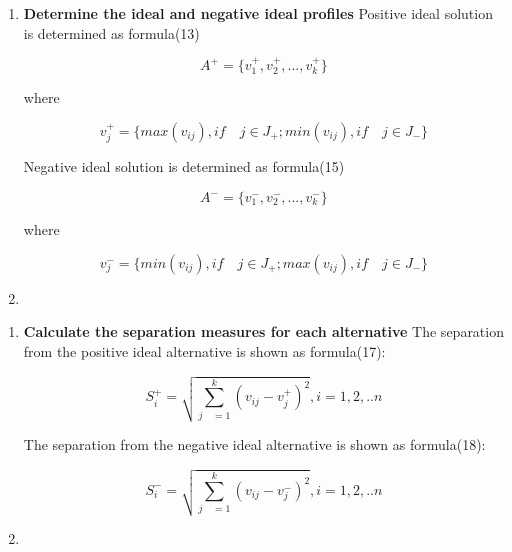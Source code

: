 \documentclass{mcmthesis}
\begin{document}
\begin{enumerate}
        \begin{enumerate}
          \item \textbf{Determine the ideal and negative ideal profiles}
          Positive ideal solution is determined as formula(13)
            \begin{table}[!hbpt]
               \centering
               $$ { A }^{ + }=\{ { v }_{ 1 }^{ + },{ v }_{ 2 }^{ + },...,{ v }_{ k }^{ + }\}  $$
             \end{table}
        where
            \begin{table}[!hbpt]
               \centering
               $$ { v }_{ j }^{ + }=\{ max({ v }_{ ij }),if\quad j\in J_+;min({ v }_{ ij }),if\quad j\in J_-\}  $$
             \end{table}
        Negative ideal solution is determined as formula(15)
            \begin{table}[!hbpt]
               \centering
               $$ { A }^{ - }=\{ { v }_{ 1 }^{ - },{ v }_{ 2 }^{ - },...,{ v }_{ k }^{ - }\}  $$
             \end{table}
        where
            \begin{table}[!hbpt]
               \centering
               $$ { v }_{ j }^{ - }=\{ min({ v }_{ ij }),if\quad j\in J_+;max({ v }_{ ij }),if\quad j\in J_-\}   $$
             \end{table}
            \item
           \end{enumerate}

        \begin{enumerate}
          \item \textbf{Calculate the separation measures for each alternative}
         The separation from the positive ideal alternative is shown as formula(17):
            \begin{table}[!hbpt]
               \centering
               $$ { S }_{ i }^{ + }=\sqrt { \sum _{ j\quad =1 }^{ k }{ { ({ v }_{ ij }-{ v }_{ j }^{ + }) }^{ 2 } }  } ,i = 1,2,..n $$
             \end{table}
          The separation from the negative ideal alternative is shown as formula(18):
            \begin{table}[!hbpt]
               \centering
               $$ { S }_{ i }^{ - }=\sqrt { \sum _{ j\quad =1 }^{ k }{ { ({ v }_{ ij }-{ v }_{ j }^{ - }) }^{ 2 } }  } ,i = 1,2,..n $$
             \end{table}
            \item
           \end{enumerate}


\end{enumerate}
\end{document}
